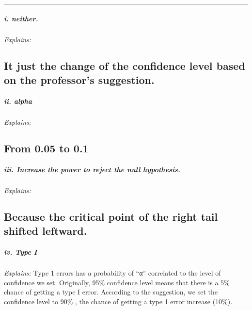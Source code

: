 \documentclass[
]{article}
\begin{document}
\begin{center}\rule{0.5\linewidth}{0.5pt}\end{center}

\hypertarget{i.-neither.}{%
\subparagraph{\texorpdfstring{i.
\emph{neither.}}{i. neither.}}\label{i.-neither.}}

\emph{Explains:}

\hypertarget{it-just-the-change-of-the-confidence-level-based-on-the-professors-suggestion.}{%
\subsection{It just the change of the confidence level based on the
professor's
suggestion.}\label{it-just-the-change-of-the-confidence-level-based-on-the-professors-suggestion.}}

\hypertarget{ii.-alpha}{%
\subparagraph{\texorpdfstring{ii.
\emph{alpha}}{ii. alpha}}\label{ii.-alpha}}

\emph{Explains:}

\hypertarget{from-0.05-to-0.1}{%
\subsection{From 0.05 to 0.1}\label{from-0.05-to-0.1}}

\hypertarget{iii.-increase-the-power-to-reject-the-null-hypothesis.}{%
\subparagraph{\texorpdfstring{iii. \emph{Increase the power to reject
the null
hypothesis.}}{iii. Increase the power to reject the null hypothesis.}}\label{iii.-increase-the-power-to-reject-the-null-hypothesis.}}

\emph{Explains:}

\hypertarget{because-the-critical-point-of-the-right-tail-shifted-leftward.}{%
\subsection{Because the critical point of the right tail shifted
leftward.}\label{because-the-critical-point-of-the-right-tail-shifted-leftward.}}

\hypertarget{iv.-type-i}{%
\subparagraph{\texorpdfstring{iv. \emph{Type
I}}{iv. Type I}}\label{iv.-type-i}}

\emph{Explains:} Type 1 errors has a probability of ``α'' correlated to
the level of confidence we set. Originally, 95\% confidence level means
that there is a 5\% chance of getting a type I error. According to the
suggestion, we set the confidence level to 90\% , the chance of getting
a type 1 error increase (10\%).
\end{document}
